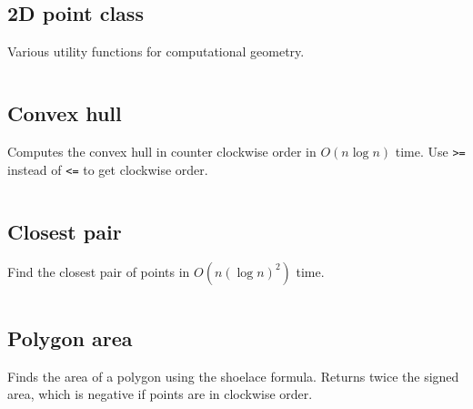 \documentclass[10pt,a4paper,landscape,oneside]{amsart}
\newcommand{\code}[1]{\inputminted[fontsize=\large,tabsize=2,baselinestretch=1]{java}{#1}}
\begin{document}
\begin{multicols*}{2}
\subsection{2D point class}
Various utility functions for computational geometry.
\code{geometry/geometry.java}

\subsection{Convex hull}
Computes the convex hull in counter clockwise order in \(O(n \log n)\) time.
Use \verb|>=| instead of \verb|<=| to get clockwise order.
\code{geometry/convex-hull.java}
\subsection{Closest pair}
Find the closest pair of points in \(O(n (\log n)^2)\) time.
\code{geometry/closest-pair.java}
\subsection{Polygon area}
Finds the area of a polygon using the shoelace formula. Returns twice the signed area,
which is negative if points are in clockwise order.
\code{geometry/polygon-area.java}

\end{multicols*}
\end{document}
